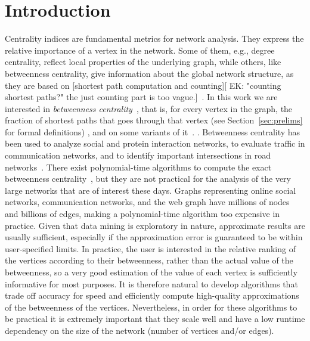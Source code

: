 \section{Introduction}\label{sec:intro}
Centrality indices are fundamental metrics for network analysis. They express the
relative importance of a vertex in the network. Some of them, e.g., degree
centrality, reflect local properties of the underlying graph, while others,
like betweenness centrality, give information about the global network
structure, as they are based on [shortest path computation and counting][ EK: "counting shortest paths?" the just counting part is too vague.]~\citep{Newman10}. In
this work we are interested in \emph{betweenness
centrality}~\citep{Anthonisse71,Freeman77}, that is, for every vertex in the
graph, the fraction of shortest paths that goes through that vertex (see
Section~\ref{sec:prelims} for formal definitions)
\ifproof
, and on some variants of it~\citep{OpsahlAS10,BorgattiE06,Brandes08}. %
\else
. %
\fi
Betweenness centrality has been used to analyze social and protein interaction
networks, to evaluate traffic in communication networks, and to identify
important intersections in road networks~\citep{Newman10,GeisbergerSS08}. There
exist polynomial-time algorithms to compute the exact betweenness
centrality~\citep{Brandes01}, but they are not practical for the analysis of the
very large networks that are of interest these days. Graphs representing online
social networks, communication networks, and the web graph have millions of
nodes and billions of edges, making a polynomial-time algorithm too expensive in
practice. Given that data mining is exploratory in nature, approximate results
are usually sufficient, especially if the approximation error is guaranteed to
be within user-specified limits. In practice, the user is interested in the
relative ranking of the vertices according to their betweenness, rather than the
actual value of the betweenness, so a very good estimation of the value of each
vertex is sufficiently informative for most purposes. It is therefore natural to
develop algorithms that trade off accuracy for speed and efficiently compute
high-quality approximations of the betweenness of the vertices.  Nevertheless,
in order for these algorithms to be practical it is extremely important that
they scale well and have a low runtime dependency on the size of the network
(number of vertices and/or edges).

